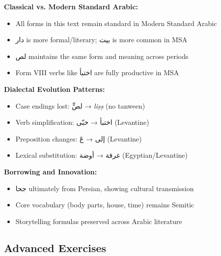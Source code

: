 \documentclass[letterpaper,12pt]{article}
\begin{document}
\begin{tcolorbox}[colback=white,colframe=accentcolor,title=\textbf{Diachronic Analysis},breakable]
\textbf{Classical vs. Modern Standard Arabic:}
\begin{itemize}
\item All forms in this text remain standard in Modern Standard Arabic
\item \textarabic{دار} is more formal/literary; \textarabic{بيت} is more common in MSA
\item \textarabic{لص} maintains the same form and meaning across periods
\item Form VIII verbs like \textarabic{اختبأ} are fully productive in MSA
\end{itemize}

\textbf{Dialectal Evolution Patterns:}
\begin{itemize}
\item Case endings lost: \textarabic{لصٍّ} → \textit{liṣṣ} (no tanween)
\item Verb simplification: \textarabic{اختبأ} → \textarabic{خبّى} (Levantine)
\item Preposition changes: \textarabic{إلى} → \textarabic{عَ} (Levantine)
\item Lexical substitution: \textarabic{غرفة} → \textarabic{أوضة} (Egyptian/Levantine)
\end{itemize}

\textbf{Borrowing and Innovation:}
\begin{itemize}
\item \textarabic{جحا} ultimately from Persian, showing cultural transmission
\item Core vocabulary (body parts, house, time) remains Semitic
\item Storytelling formulas preserved across Arabic literature
\end{itemize}
\end{tcolorbox}

\subsection{Advanced Exercises}
\end{document}
